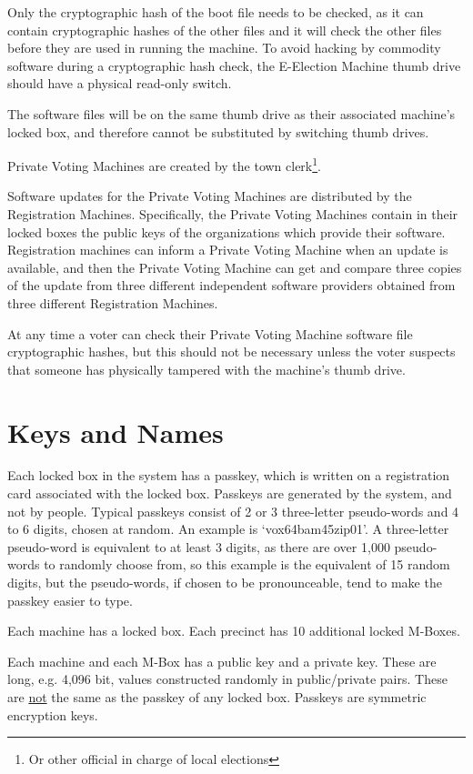 \documentclass[12pt]{article}
\begin{document}
Only the cryptographic hash of the boot file needs to be checked,
as it can contain cryptographic hashes of the other files and it will check
the other files before they are used in running the machine.
To avoid hacking by commodity software during a cryptographic hash check,
the E-Election Machine thumb drive should have a physical read-only
switch.

The software files will be on
the same thumb drive as their associated machine's locked box, and
therefore cannot be substituted by switching thumb drives.

Private Voting Machines are created by the town clerk\footnote{Or
other official in charge of local elections}.

Software updates for the Private Voting Machines are distributed
by the Registration Machines.  Specifically, the Private Voting
Machines contain in their locked boxes the public keys of
the organizations which provide their software.  Registration machines
can inform a Private Voting Machine when an update is available,
and then the Private Voting Machine can get and compare three copies of the
update from three different independent
software providers obtained from three different Registration Machines.

At any time a voter can check their Private Voting Machine
software file cryptographic hashes, but this should not be
necessary unless the voter
suspects that someone has physically tampered with the machine's thumb drive.



\section{Keys and Names}

Each locked box in the system has a passkey, which is
written on a registration card associated with the locked
box.  Passkeys are generated by the system, and not by
people.  Typical passkeys consist of 2 or 3 three-letter pseudo-words
and 4 to 6 digits, chosen at random.  An example is
`vox64bam45zip01'.  A three-letter pseudo-word is equivalent to at least 3
digits, as there are over 1,000 pseudo-words to randomly choose from,
so this example is the equivalent of 15 random
digits, but the pseudo-words, if chosen to be pronounceable,
tend to make the passkey easier to type.

Each machine has a locked box.  Each precinct
has 10 additional locked M-Boxes.

Each machine and each M-Box has a public key and a private key.  These
are long, e.g. 4,096 bit, values constructed randomly
in public/private pairs.
These are \underline{not} the same as the passkey of any locked box.
Passkeys are symmetric encryption keys.
\end{document}
